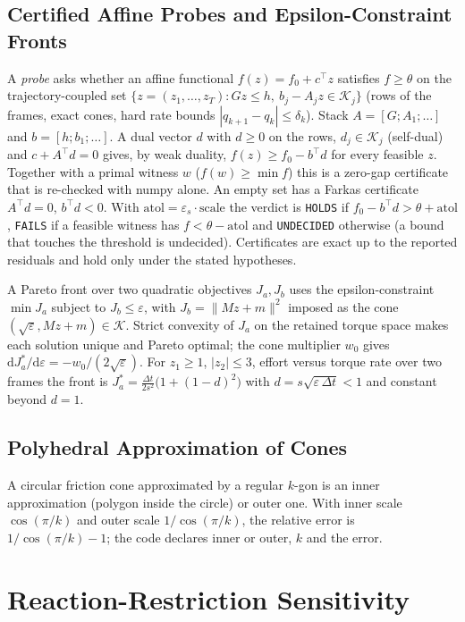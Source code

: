 \documentclass[11pt,a4paper]{article}
\begin{document}
\subsection{Certified Affine Probes and Epsilon-Constraint Fronts}
A \emph{probe} asks whether an affine functional $f(z)=f_0+c^{\top}z$ satisfies
$f\ge\theta$ on the trajectory-coupled set
$\{z=(z_1,\dots,z_T):G z\le h,\ b_j-A_jz\in\mathcal K_j\}$ (rows of the frames,
exact cones, hard rate bounds $|q_{k+1}-q_k|\le\delta_k$).  Stack
$A=[G;A_1;\dots]$ and $b=[h;b_1;\dots]$.  A dual vector $d$ with $d\ge0$ on the
rows, $d_j\in\mathcal K_j$ (self-dual) and $c+A^{\top}d=0$ gives, by weak
duality, $f(z)\ge f_0-b^{\top}d$ for every feasible $z$.  Together with a
primal witness $w$ ($f(w)\ge\min f$) this is a zero-gap certificate that is
re-checked with numpy alone.  An empty set has a Farkas certificate
$A^{\top}d=0$, $b^{\top}d<0$.  With $\mathrm{atol}=\varepsilon_s\cdot\text{scale}$
the verdict is \texttt{HOLDS} if $f_0-b^{\top}d>\theta+\mathrm{atol}$,
\texttt{FAILS} if a feasible witness has $f<\theta-\mathrm{atol}$ and
\texttt{UNDECIDED} otherwise (a bound that touches the threshold is
undecided).  Certificates are exact up to the reported residuals and hold only
under the stated hypotheses.

A Pareto front over two quadratic objectives $J_a,J_b$ uses the
epsilon-constraint $\min J_a$ subject to $J_b\le\varepsilon$, with
$J_b=\lVert Mz+m\rVert^2$ imposed as the cone
$(\sqrt{\varepsilon},Mz+m)\in\mathcal K$.  Strict convexity of $J_a$ on the
retained torque space makes each solution unique and Pareto optimal; the cone
multiplier $w_0$ gives $\mathrm{d}J_a^{*}/\mathrm{d}\varepsilon=-w_0/(2\sqrt{\varepsilon})$.
For $z_1\ge1$, $|z_2|\le3$, effort versus torque rate over two frames the front
is $J_a^{*}=\tfrac{\Delta t}{2s^2}\bigl(1+(1-d)^2\bigr)$ with
$d=s\sqrt{\varepsilon\,\Delta t}<1$ and constant beyond $d=1$.

\subsection{Polyhedral Approximation of Cones}
A circular friction cone approximated by a regular $k$-gon is an inner
approximation (polygon inside the circle) or outer one.  With inner scale
$\cos(\pi/k)$ and outer scale $1/\cos(\pi/k)$, the relative error is
$1/\cos(\pi/k)-1$; the code declares inner or outer, $k$ and the error.

\section{Reaction-Restriction Sensitivity}
\label{sec:restriction}
\end{document}
